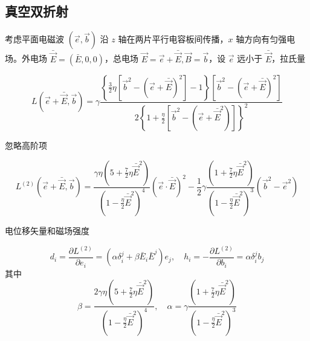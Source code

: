 \documentclass[9pt, dvipsnames]{beamer} %
\begin{document}
\subsection{真空双折射}

\begin{frame}
        考虑平面电磁波 $(\vec{e},\vec{b}) $ 沿 $z $ 轴在两片平行电容板间传播，$x $ 轴方向有匀强电场。外电场 $\bar{\vec{E}}=(\bar{E},0,0) $，总电场 $\vec{E}=\vec{e}+\bar{\vec{E}},\vec{B}=\vec{b} $，设 $\vec{e} $ 远小于 $\bar{\vec{E}} $，拉氏量

    $$
    L\left(\vec{e}+\bar{\vec{E}},\vec{b} \right)
    =\gamma\frac{\left\{\frac{3 }{2 } \eta\left[\vec{b}^2-\left(\vec{e}+\bar{\vec{E}} \right)^2 \right] - 1 \right\}\left[\vec{b}^2-\left(\vec{e}+\bar{\vec{E}} \right)^2 \right] }{2\left\{1+\frac{\eta }{2 } \left[\vec{b}^2-\left(\vec{e} + \bar{\vec{E}}^2 \right) \right] \right\}^2 } 
    $$
    
    忽略高阶项
    
    $$
    L^{(2)}(\vec{e}+\bar{\vec{E}},\vec{b})
    =\frac{\gamma\eta\left(5+\frac{7 }{2 } \eta \bar{\vec{E}}^2 \right) }{\left(1-\frac{\eta }{2 } \bar{\vec{E}}^2 \right)^4 }\left(\vec{e}\cdot\bar{\vec{E}} \right)^2 - \frac{1 }{2 } \gamma \frac{\left(1+\frac{7 }{2 } \eta \bar{\vec{E}}^2 \right) }{\left(1-\frac{\eta }{2 } \bar{\vec{E}}^2 \right)^3 }\left(\vec{b}^2-\vec{e}^2 \right) 
    $$
    
    电位移矢量和磁场强度
    
    $$
    d_i = \frac{\partial L^{(2)} }{\partial e_i } = \left(\alpha\delta_i^j+\beta\bar{E}_i\bar{E}^j \right)e_j,\quad
    h_i
    =-\frac{\partial L^{(2)} }{\partial b_i } 
    =\alpha\delta_i^j b_j 
    $$
    其中
    $$
    \beta = \frac{2\gamma \eta\left(5+\frac{7 }{2 } \eta \bar{\vec{E}}^2 \right) }{\left(1-\frac{\eta }{2 } \bar{\vec{E}}^2 \right)^4 },\quad 
    \alpha = \gamma \frac{\left(1+\frac{7 }{2 }\eta\bar{\vec{E}}^2 \right)  }{\left(1-\frac{\eta }{2 } \bar{\vec{E}}^2 \right)^3 }
    $$
\end{frame}
\end{document}
